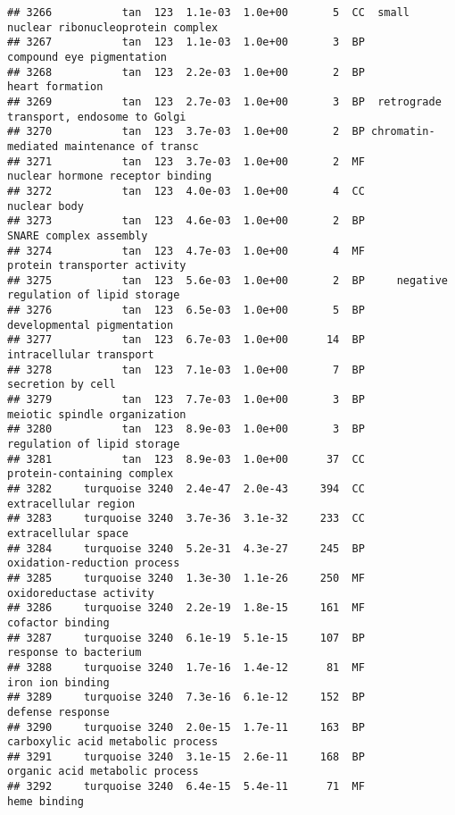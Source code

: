 \documentclass[]{article}
\begin{document}
\begin{verbatim}
## 3266           tan  123  1.1e-03  1.0e+00       5  CC  small nuclear ribonucleoprotein complex
## 3267           tan  123  1.1e-03  1.0e+00       3  BP                compound eye pigmentation
## 3268           tan  123  2.2e-03  1.0e+00       2  BP                          heart formation
## 3269           tan  123  2.7e-03  1.0e+00       3  BP  retrograde transport, endosome to Golgi
## 3270           tan  123  3.7e-03  1.0e+00       2  BP chromatin-mediated maintenance of transc
## 3271           tan  123  3.7e-03  1.0e+00       2  MF         nuclear hormone receptor binding
## 3272           tan  123  4.0e-03  1.0e+00       4  CC                             nuclear body
## 3273           tan  123  4.6e-03  1.0e+00       2  BP                   SNARE complex assembly
## 3274           tan  123  4.7e-03  1.0e+00       4  MF             protein transporter activity
## 3275           tan  123  5.6e-03  1.0e+00       2  BP     negative regulation of lipid storage
## 3276           tan  123  6.5e-03  1.0e+00       5  BP               developmental pigmentation
## 3277           tan  123  6.7e-03  1.0e+00      14  BP                  intracellular transport
## 3278           tan  123  7.1e-03  1.0e+00       7  BP                        secretion by cell
## 3279           tan  123  7.7e-03  1.0e+00       3  BP             meiotic spindle organization
## 3280           tan  123  8.9e-03  1.0e+00       3  BP              regulation of lipid storage
## 3281           tan  123  8.9e-03  1.0e+00      37  CC               protein-containing complex
## 3282     turquoise 3240  2.4e-47  2.0e-43     394  CC                     extracellular region
## 3283     turquoise 3240  3.7e-36  3.1e-32     233  CC                      extracellular space
## 3284     turquoise 3240  5.2e-31  4.3e-27     245  BP              oxidation-reduction process
## 3285     turquoise 3240  1.3e-30  1.1e-26     250  MF                  oxidoreductase activity
## 3286     turquoise 3240  2.2e-19  1.8e-15     161  MF                         cofactor binding
## 3287     turquoise 3240  6.1e-19  5.1e-15     107  BP                    response to bacterium
## 3288     turquoise 3240  1.7e-16  1.4e-12      81  MF                         iron ion binding
## 3289     turquoise 3240  7.3e-16  6.1e-12     152  BP                         defense response
## 3290     turquoise 3240  2.0e-15  1.7e-11     163  BP        carboxylic acid metabolic process
## 3291     turquoise 3240  3.1e-15  2.6e-11     168  BP           organic acid metabolic process
## 3292     turquoise 3240  6.4e-15  5.4e-11      71  MF                             heme binding

\end{verbatim}
\end{document}
